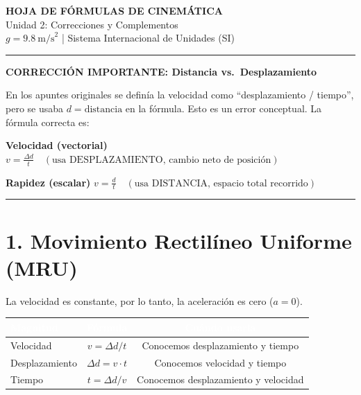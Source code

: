 \documentclass[10pt,a4paper]{article}
\newcommand{\formulabox}[2]{%
  \begin{tcolorbox}[colback=azulclr, colframe=azul, arc=4pt, boxrule=0.5pt,
    left=8pt, right=8pt, top=6pt, bottom=6pt, width=\textwidth]
    \textbf{\textcolor{azul}{#1}} \quad $\displaystyle #2$
  \end{tcolorbox}%
}
\newcommand{\alertbox}[1]{%
  \begin{tcolorbox}[colback=alertaclr, colframe=alerta, arc=4pt, boxrule=0.5pt,
    left=8pt, right=8pt, top=6pt, bottom=6pt, width=\textwidth]
    \textbf{\textcolor{alerta}{#1}}
  \end{tcolorbox}%
}
\begin{document}
\thispagestyle{fancy}
\begin{center}
  {\Huge\bfseries\color{azul} HOJA DE FÓRMULAS DE CINEMÁTICA}\\[4pt]
  {\large\color{gris} Unidad 2: Correcciones y Complementos}\\[4pt]
  {\color{gris} $g = 9.8\ \text{m/s}^2$ \;|\; Sistema Internacional de Unidades (SI)}
\end{center}
\vspace{6pt}
\hrule height 0.5pt \color{gris}
\vspace{10pt}

\alertbox{\textbf{CORRECCIÓN IMPORTANTE:} Distancia vs.\ Desplazamiento}

En los apuntes originales se definía la velocidad como ``desplazamiento / tiempo'', pero se usaba $d = \text{distancia}$ en la fórmula. Esto es un error conceptual. La fórmula correcta es:

\formulabox{Velocidad (vectorial)}{v = \frac{\Delta d}{t} \quad (\text{usa DESPLAZAMIENTO, cambio neto de posición})}
\formulabox{Rapidez (escalar)}{v = \frac{d}{t} \quad (\text{usa DISTANCIA, espacio total recorrido})}

\vspace{6pt}
\hrule height 0.5pt
\vspace{12pt}

\section{1. Movimiento Rectilíneo Uniforme (MRU)}

La velocidad es constante, por lo tanto, la aceleración es cero ($a = 0$).

\vspace{4pt}
\begin{tabularx}{\textwidth}{LCC}
  \toprule
  \textbf{\textcolor{white}{Magnitud}} &
  \textbf{\textcolor{white}{Fórmula}} &
  \textbf{\textcolor{white}{Cuándo usarla}} \\
  \midrule
  Velocidad     & $v = \Delta d / t$     & Conocemos desplazamiento y tiempo \\
  Desplazamiento & $\Delta d = v \cdot t$ & Conocemos velocidad y tiempo \\
  Tiempo        & $t = \Delta d / v$     & Conocemos desplazamiento y velocidad \\
  \bottomrule
\end{tabularx}
\vspace{12pt}
\end{document}
